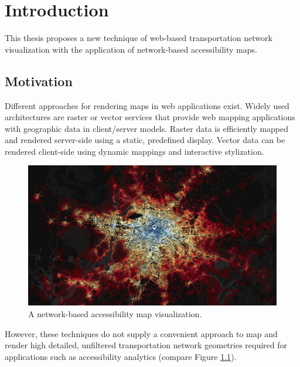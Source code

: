 
\cleardoublepage              %
\chapter{Introduction}
  \label{chap:intro}
  This thesis proposes a new technique of web-based transportation network
  visualization with the application of network-based accessibility maps.\par

  \section{Motivation}
    \label{sec:intro:motiv}
    Different approaches for rendering maps in web applications exist.
    Widely used architectures are raster or vector services that provide web
    mapping applications with geographic data in client/server models.
    Raster data is efficiently mapped and rendered server-side using a
    static, predefined display. Vector data can be rendered client-side
    using dynamic mappings and interactive stylization.\par

    \begin{figure}[h]
      \centering
      \includegraphics[width=\linewidth]{./img/screenshot-teaser-7200s-publictransport.png}
      \caption{A network-based accessibility map visualization.}
      \label{fig:intro:teasr}
    \end{figure}

    However, these techniques do not supply a convenient approach to map and
    render high detailed, unfiltered transportation network geometries
    required for applications such as accessibility analytics (compare Figure
    \ref{fig:intro:teasr}).\par

